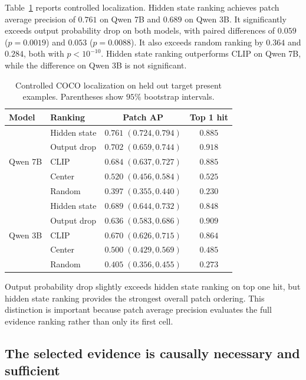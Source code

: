 \documentclass{article}
\begin{document}
Table~\ref{tab:localization} reports controlled localization. Hidden state ranking achieves patch average precision of $0.761$ on Qwen 7B and $0.689$ on Qwen 3B. It significantly exceeds output probability drop on both models, with paired differences of $0.059$ ($p=0.0019$) and $0.053$ ($p=0.0088$). It also exceeds random ranking by $0.364$ and $0.284$, both with $p<10^{-10}$. Hidden state ranking outperforms CLIP on Qwen 7B, while the difference on Qwen 3B is not significant.

\begin{table}[t]
\centering
\caption{Controlled COCO localization on held out target present examples. Parentheses show $95\%$ bootstrap intervals.}
\label{tab:localization}
\small
\begin{tabular}{llcc}
\toprule
Model & Ranking & Patch AP & Top 1 hit \\
\midrule
\multirow{5}{*}{Qwen 7B}
& Hidden state & $0.761\;(0.724,0.794)$ & $0.885$ \\
& Output drop & $0.702\;(0.659,0.744)$ & $0.918$ \\
& CLIP & $0.684\;(0.637,0.727)$ & $0.885$ \\
& Center & $0.520\;(0.456,0.584)$ & $0.525$ \\
& Random & $0.397\;(0.355,0.440)$ & $0.230$ \\
\midrule
\multirow{5}{*}{Qwen 3B}
& Hidden state & $0.689\;(0.644,0.732)$ & $0.848$ \\
& Output drop & $0.636\;(0.583,0.686)$ & $0.909$ \\
& CLIP & $0.670\;(0.626,0.715)$ & $0.864$ \\
& Center & $0.500\;(0.429,0.569)$ & $0.485$ \\
& Random & $0.405\;(0.356,0.455)$ & $0.273$ \\
\bottomrule
\end{tabular}
\end{table}

Output probability drop slightly exceeds hidden state ranking on top one hit, but hidden state ranking provides the strongest overall patch ordering. This distinction is important because patch average precision evaluates the full evidence ranking rather than only its first cell.

\subsection{The selected evidence is causally necessary and sufficient}
\end{document}
